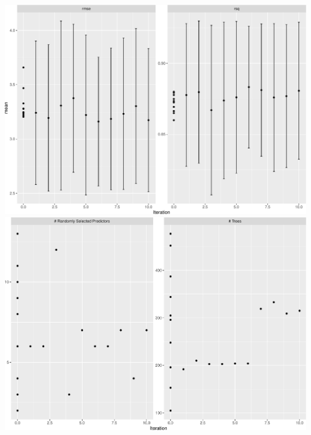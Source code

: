 \documentclass[
  ignorenonframetext,
]{beamer}
\begin{document}
\begin{frame}[fragile]
\includegraphics{L7_files/figure-beamer/unnamed-chunk-9-1.pdf}
\includegraphics{L7_files/figure-beamer/unnamed-chunk-9-2.pdf}
\end{frame}
\end{document}
